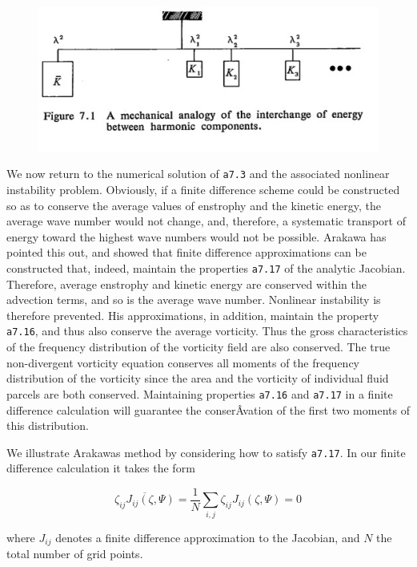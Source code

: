 \begin{figure}
\centering
\includegraphics[keepaspectratio]{figs/NM/pic71.jpg}
\caption{} \label{fig:}
\end{figure}

We now return to the numerical solution of \texttt{a7.3} and the
associated nonlinear instability problem. Obviously, if a finite
difference scheme could be constructed so as to conserve the average
values of enstrophy and the kinetic energy, the average wave number
would not change, and, therefore, a systematic transport of energy
toward the highest wave numbers would not be possible. Arakawa has
pointed this out, and showed that finite difference approximations can
be constructed that, indeed, maintain the properties \texttt{a7.17} of
the analytic Jacobian. Therefore, average enstrophy and kinetic energy
are conserved within the advection terms, and so is the average wave
number. Nonlinear instability is therefore prevented. His
approximations, in addition, maintain the property \texttt{a7.16}, and
thus also conserve the average vorticity. Thus the gross characteristics
of the frequency distribution of the vorticity field are also conserved.
The true non-divergent vorticity equation conserves all moments of the
frequency distribution of the vorticity since the area and the vorticity
of individual fluid parcels are both conserved. Maintaining properties
\texttt{a7.16} and \texttt{a7.17} in a finite difference calculation
will guarantee the conserÂ­vation of the first two moments of this
distribution.

We illustrate Arakawa\textquotesingle s method by considering how to
satisfy \texttt{a7.17}. In our finite difference calculation it takes
the form

{\[\overline{\zeta_{ij}J_{ij}(\zeta,\Psi)} = \frac{1}{N}\sum_{i,j}\zeta_{ij}J_{ij}(\zeta,\Psi) = 0\]}

where \(J_{ij}\) denotes a finite difference approximation to the
Jacobian, and \(N\) the total number of grid points.

